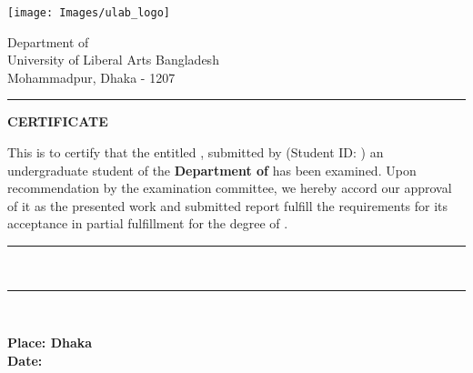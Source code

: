 \thispagestyle{plain}
\noindent
\begin{minipage}{0.37\textwidth}
\texttt{[image: Images/ulab\_logo]}
\end{minipage}
\begin{minipage}{0.63\textwidth}

 Department of \Department \\
 University of Liberal Arts Bangladesh \\
 Mohammadpur, Dhaka - 1207
\end{minipage}

\vspace{0.5\baselineskip}
\hrule
\vspace{2\baselineskip}

\begin{center}
{\Large {\bf \uppercase{Certificate}}}
\end{center}

\vspace{\baselineskip}

\noindent This is to certify that the \MakeTextLowercase{\RoportType} entitled {\bf \ReportTitle}, submitted by {\bf \firstAuthor} (Student ID: {\textit{\firstAuthorID}}) an undergraduate student of the {\bf Department of \Department} has been examined. Upon recommendation by the examination committee, we hereby accord our approval of it as the presented work and submitted report fulfill the requirements for its acceptance in partial fulfillment for the degree of \emph{\Degree}. 

\vspace{3\baselineskip}
\begin{flushright}
\begin{minipage}[c]{0.63\textwidth}
\centering
\hrule 
\vspace{0.5\baselineskip}
{\bf \Supervisor \\ \SupervisorPosition} \par
{}
\end{minipage}
\end{flushright}
\vspace{2\baselineskip}
\begin{flushright}
\begin{minipage}[c]{0.63\textwidth}
\centering
\hrule 
\vspace{0.5\baselineskip}
{\bf \HodName\\ \HodPosition} \par
{}
\end{minipage}
\end{flushright}
\vspace{\baselineskip}

\noindent
{\bf Place: Dhaka} \\
{\bf Date: \reportSubmissionDate}